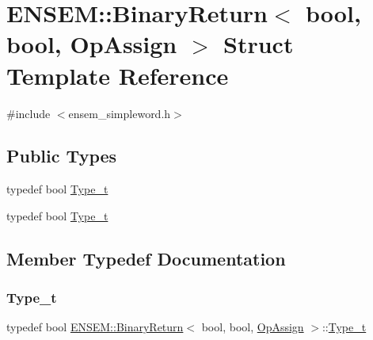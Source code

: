 \hypertarget{structENSEM_1_1BinaryReturn_3_01bool_00_01bool_00_01OpAssign_01_4}{}\section{E\+N\+S\+EM\+:\+:Binary\+Return$<$ bool, bool, Op\+Assign $>$ Struct Template Reference}
\label{structENSEM_1_1BinaryReturn_3_01bool_00_01bool_00_01OpAssign_01_4}


{\ttfamily \#include $<$ensem\+\_\+simpleword.\+h$>$}

\subsection*{Public Types}
\begin{DoxyCompactItemize}
\item 
typedef bool \mbox{\hyperlink{structENSEM_1_1BinaryReturn_3_01bool_00_01bool_00_01OpAssign_01_4_a5520ece3a7087e94fe3d252e1d2ab29f}{Type\+\_\+t}}
\item 
typedef bool \mbox{\hyperlink{structENSEM_1_1BinaryReturn_3_01bool_00_01bool_00_01OpAssign_01_4_a5520ece3a7087e94fe3d252e1d2ab29f}{Type\+\_\+t}}
\end{DoxyCompactItemize}


\subsection{Member Typedef Documentation}
\mbox{\label{structENSEM_1_1BinaryReturn_3_01bool_00_01bool_00_01OpAssign_01_4_a5520ece3a7087e94fe3d252e1d2ab29f}} 
\subsubsection{\texorpdfstring{Type\_t}{Type\_t}\hspace{0.1cm}{\footnotesize\ttfamily [1/2]}}
{\footnotesize\ttfamily typedef bool \mbox{\hyperlink{structENSEM_1_1BinaryReturn}{E\+N\+S\+E\+M\+::\+Binary\+Return}}$<$ bool, bool, \mbox{\hyperlink{structENSEM_1_1OpAssign}{Op\+Assign}} $>$\+::\mbox{\hyperlink{structENSEM_1_1BinaryReturn_3_01bool_00_01bool_00_01OpAssign_01_4_a5520ece3a7087e94fe3d252e1d2ab29f}{Type\+\_\+t}}}

